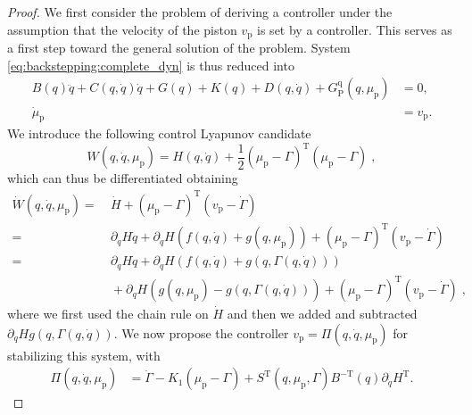 \begin{proof}
	
	We first consider the problem of deriving a controller under the assumption that the velocity of the piston $v_\mathrm{p}$ is set by a controller. This serves as a first step toward the general solution of the problem. System \eqref{eq:backstepping:complete_dyn} is thus reduced into
	\begin{equation}\label{eq:backstepping:intermediate}
	\begin{split}
	B(q)\ddot{q} \! + \! C(q,\dot{q})\dot{q} \! + \! G(q) \! + \! K(q) \! + \! D(q,\dot{q}) \! + \! G_{\mathrm{P}}^{\mathrm{q}}(q,\mu_\mathrm{p}) &= 0, \\
	\dot{\mu}_\mathrm{p} &= v_\mathrm{p}. 
	\end{split}
	\end{equation}
	We introduce the following control Lyapunov candidate
	\begin{equation}
		W(q,\dot{q},\mu_\mathrm{p}) = H(q,\dot{q}) + \frac{1}{2}(\mu_\mathrm{p} - \Gamma)^{\mathrm{T}}(\mu_\mathrm{p} - \Gamma)\;,
	\end{equation}
	which can thus be differentiated obtaining
	\begin{equation}
		\begin{split}
			\dot{W}(q,\dot{q},\mu_\mathrm{p}) =& \: \dot{H} + (\mu_\mathrm{p} - \Gamma)^{\mathrm{T}}(v_\mathrm{p} - \dot\Gamma)\\
			=&  \: \partial_{q} H \dot{q} + \partial_{\dot{q}} H (f(q,\dot{q}) + g(q,\mu_\mathrm{p})) + (\mu_\mathrm{p} - \Gamma)^{\mathrm{T}}(v_\mathrm{p} - \dot\Gamma) \\
			=& \: \partial_{q} H \dot{q} + \partial_{\dot{q}} H (f(q,\dot{q}) + g(q,\Gamma(q,\dot{q}))) \\
			& \: + \partial_{\dot{q}} H (g(q,\mu_\mathrm{p}) - g(q,\Gamma(q,\dot{q}))) + (\mu_\mathrm{p} - \Gamma)^{\mathrm{T}} (v_\mathrm{p} - \dot\Gamma)\;,
		\end{split}
	\end{equation}
	where we first used the chain rule on $\dot{H}$ and then we added and subtracted $\partial_{\dot{q}} H g(q,\Gamma(q,\dot{q}))$.
	We now propose the controller $v_\mathrm{p} = \Pi(q,\dot{q},\mu_\mathrm{p})$ for stabilizing this system, with
	\begin{equation*}
		\begin{split}
			\Pi(q,\dot{q},\mu_\mathrm{p}) &= \dot{\Gamma} - K_1 (\mu_\mathrm{p} - \Gamma) + S^{\mathrm{T}}(q,\mu_\mathrm{p},\Gamma)B^{-\mathrm{T}}(q)\partial_{\dot{q}} H^{\mathrm{T}}.

\end{split}
\end{equation*}
\end{proof}
